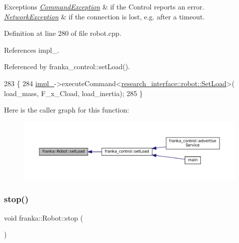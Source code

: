 \begin{DoxyExceptions}{Exceptions}
{\em \hyperlink{structfranka_1_1CommandException}{Command\+Exception}} & if the Control reports an error. \\
\hline
{\em \hyperlink{structfranka_1_1NetworkException}{Network\+Exception}} & if the connection is lost, e.\+g. after a timeout. \\
\hline
\end{DoxyExceptions}


Definition at line 280 of file robot.\+cpp.



References impl\+\_\+.



Referenced by franka\+\_\+control\+::set\+Load().


\begin{DoxyCode}
283                                              \{
284   \hyperlink{classfranka_1_1Robot_aca155054184e5b6478942fd6a1b82ba4}{impl\_}->executeCommand<\hyperlink{structresearch__interface_1_1robot_1_1SetLoad}{research\_interface::robot::SetLoad}>(
      load\_mass, F\_x\_Cload, load\_inertia);
285 \}
\end{DoxyCode}
Here is the caller graph for this function\+:
\nopagebreak
\begin{figure}[H]
\begin{center}
\leavevmode
\includegraphics[width=350pt]{classfranka_1_1Robot_afcb708df10f24563dbcf7d5b907b4a15_icgraph}
\end{center}
\end{figure}
\mbox{\label{classfranka_1_1Robot_a69cb08e075a81ecf3f26e94d26a06296}} 
\subsubsection{\texorpdfstring{stop()}{stop()}}
{\footnotesize\ttfamily void franka\+::\+Robot\+::stop (\begin{DoxyParamCaption}{ }\end{DoxyParamCaption})}

